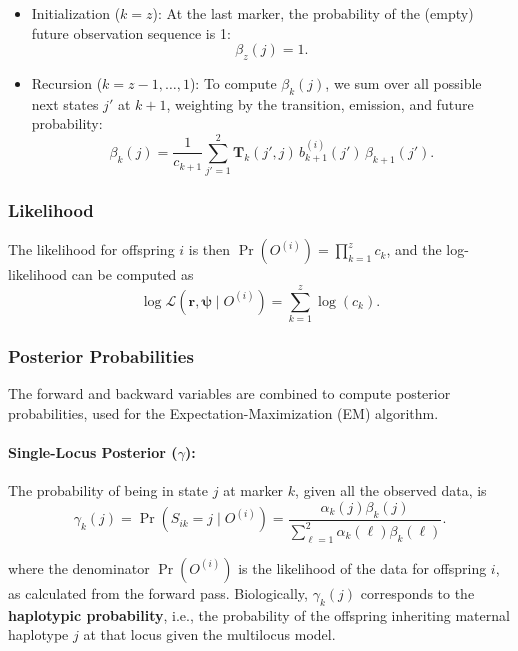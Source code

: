 \documentclass[11pt]{article}
\begin{document}
\begin{itemize}
    \item Initialization ($k=z$): At the last marker, the probability of the (empty) future observation sequence is 1:
\begin{equation}
    \beta_z(j) = 1.
\end{equation}

\item Recursion ($k=z-1, \dots, 1$):  To compute $\beta_k(j)$, we sum over all possible next states $j'$ at $k+1$, weighting by the transition, emission, and future probability:
\begin{equation}
    \beta_k(j)=\frac{1}{c_{k+1}}\sum_{j'=1}^{2} \mathbf{T}_k(j',j)\, b_{k+1}^{(i)}(j')\, \beta_{k+1}(j').
\end{equation}
\end{itemize}

\subsubsection{Likelihood}
The likelihood for offspring $i$ is then $\Pr(O^{(i)}) = \prod_{k=1}^z c_k$, and the log-likelihood can be computed as
\begin{equation}
    \log \mathcal{L}(\mathbf{r}, \boldsymbol{\psi} \mid O^{(i)}) = \sum_{k=1}^z \log(c_k).
\end{equation}

\subsubsection{Posterior Probabilities}
The forward and backward variables are combined to compute posterior probabilities, used for the Expectation-Maximization (EM) algorithm.

\paragraph{Single-Locus Posterior (\texorpdfstring{$\gamma$}{gamma}):} The probability of being in state $j$ at marker $k$, given all the observed data, is
\begin{equation}
\label{eq:gamma}
    \gamma_k(j) = \Pr(S_{ik}=j \mid O^{(i)}) = \frac{\alpha_k(j)\beta_k(j)}{\sum_{\ell=1}^2 \alpha_k(\ell)\beta_k(\ell)}.
\end{equation}

\noindent where the denominator $\Pr(O^{(i)})$ is the likelihood of the data for offspring $i$, as calculated from the forward pass. Biologically, $\gamma_k(j)$ corresponds to the \textbf{haplotypic probability}, i.e., the probability of the offspring inheriting maternal haplotype $j$ at that locus given the multilocus model.
\end{document}
